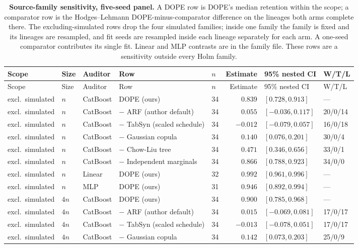 \begin{longtable}{lllllrll}
\caption{\textbf{Source-family sensitivity, five-seed panel.} A DOPE row is DOPE's median retention within the scope; a comparator row is the Hodges--Lehmann DOPE-minus-comparator difference on the lineages both arms complete there. The excluding-simulated rows drop the four simulated families; inside one family the family is fixed and its lineages are resampled, and fit seeds are resampled inside each lineage separately for each arm. A one-seed comparator contributes its single fit. Linear and MLP contrasts are in the family file. These rows are a sensitivity outside every Holm family.}\label{tab:v2-family}\\
\toprule
Scope & Size & Auditor & Row & $n$ & Estimate & 95\% nested CI & W/T/L \\
\midrule
\endfirsthead
\toprule
Scope & Size & Auditor & Row & $n$ & Estimate & 95\% nested CI & W/T/L \\
\midrule
\endhead
excl.\ simulated & $n$ & CatBoost & DOPE (ours) & 34 & $0.839$ & $[0.728, 0.913]$ & --- \\
excl.\ simulated & $n$ & CatBoost & $-$ ARF (author default) & 34 & $0.055$ & $[-0.036, 0.117]$ & 20/0/14 \\
excl.\ simulated & $n$ & CatBoost & $-$ TabSyn (scaled schedule) & 34 & $-0.012$ & $[-0.079, 0.057]$ & 16/0/18 \\
excl.\ simulated & $n$ & CatBoost & $-$ Gaussian copula & 34 & $0.140$ & $[0.076, 0.201]$ & 30/0/4 \\
excl.\ simulated & $n$ & CatBoost & $-$ Chow-Liu tree & 34 & $0.471$ & $[0.346, 0.656]$ & 33/0/1 \\
excl.\ simulated & $n$ & CatBoost & $-$ Independent marginals & 34 & $0.866$ & $[0.788, 0.923]$ & 34/0/0 \\
excl.\ simulated & $n$ & Linear & DOPE (ours) & 32 & $0.992$ & $[0.961, 0.996]$ & --- \\
excl.\ simulated & $n$ & MLP & DOPE (ours) & 31 & $0.946$ & $[0.892, 0.994]$ & --- \\
excl.\ simulated & $4n$ & CatBoost & DOPE (ours) & 34 & $0.900$ & $[0.785, 0.968]$ & --- \\
excl.\ simulated & $4n$ & CatBoost & $-$ ARF (author default) & 34 & $0.015$ & $[-0.069, 0.081]$ & 17/0/17 \\
excl.\ simulated & $4n$ & CatBoost & $-$ TabSyn (scaled schedule) & 34 & $-0.013$ & $[-0.078, 0.051]$ & 17/0/17 \\
excl.\ simulated & $4n$ & CatBoost & $-$ Gaussian copula & 34 & $0.142$ & $[0.073, 0.203]$ & 25/0/9 \\

\end{longtable}
